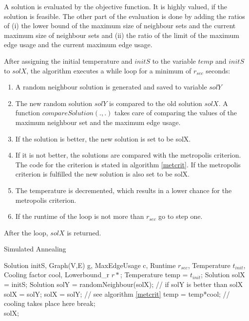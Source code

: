 \documentclass [12pt]{article}
\begin{document}
\noindent
A solution is evaluated by the objective function. It is highly valued, if the solution is
feasible. The other part of the evaluation is done by adding the ratios of (i) the lower bound of the maximum size of neighbour sets and the current maximum size of neighbour sets and
(ii) the ratio of the limit of the maximum edge usage and the current maximum edge usage.
\medskip

\noindent
After assigning the initial temperature and $initS$ to the variable $temp$ and $initS$ to $solX$,
the algorithm executes a while loop for a minimum of $r_{sec}$ seconds:
\begin{enumerate}
  \item {A random neighbour solution is generated and saved to variable $solY$}
  \item {The new random solution $solY$ is compared to the old solution $solX$. A function $compareSolution(.,.)$ takes care of 
    comparing the values of the maximum neighbour set and the maximum edge usage.}
  \item {If the solution is better, the new solution is set to be solX.}
  \item {If it is not better, the solutions are compared with the metropolis criterion. The code for the criterion is stated in algorithm \ref{metcrit}. If the metropolis criterion
    is fulfilled the new solution is also set to be solX. }
  \item {The temperature is decremented, which results in a lower chance for the metropolis criterion.}
  \item {If the runtime of the loop is not more than $r_{sec}$ go to step one.}
\end{enumerate}
After the loop, $solX$ is returned.


\begin {algorithm} [H]
\caption {Simulated Annealing}
\label {simA}
\begin {algorithmic} [3]
\Require Solution initS, Graph(V,E) g, MaxEdgeUsage c, Runtime $r_{sec}$, Temperature $t_{init}$, Cooling factor cool,
Lowerbound\_r $r*$; 
\State Temperature temp = $t_{init}$;
\State Solution solX = initS; 
\State Solution solY = randomNeighbour(solX);
 // if solY is better than solX
\State solX = solY;
\Else
{}
\State solX = solY; // see algorithm \ref{metcrit}
\EndIf
\EndIf    
\State temp = temp*cool; // cooling takes place here
\State break;
\EndIf 
\EndWhile\\
\Return solX;
\end {algorithmic}
\end {algorithm}
\end{document}
